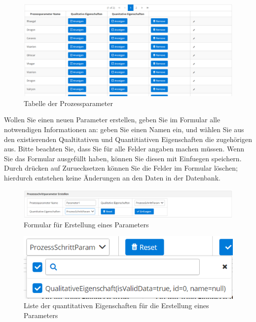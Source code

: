 \documentclass[enabledeprecatedfontcommands,fontsize=12pt,paper=a4,twoside]{scrartcl}
\begin{document}
\begin{figure}[h!]
\begin{center}
 \includegraphics[width=\textwidth]{screenshots/pk/parametertabelle.png}
  \caption{Tabelle der Prozessparameter}
  \label{fig:boat2}
\end{center}
\end{figure}


Wollen Sie einen neuen Parameter erstellen, geben Sie im Formular alle notwendigen Informationen an: geben Sie einen Namen ein, und wählen Sie aus den existierenden Qualtitativen und Quantitiativen Eigenschaften die zugehörigen aus. Bitte beachten Sie, dass Sie für alle Felder angaben machen müssen. Wenn Sie das Formular ausgefüllt haben, können Sie diesen mit Einfuegen speichern. Durch drücken auf Zuruecksetzen können Sie die Felder im Formular löschen; hierdurch entstehen keine Änderungen an den Daten in der Datenbank. \\

\begin{figure}[h!]
\begin{center}
 \includegraphics[width=\textwidth]{screenshots/pk/parameterformular.png}
  \caption{Formular für Erstellung eines Parameters}
  \label{fig:boat2}
\end{center}
\end{figure}


\begin{figure}[h!]
\begin{center}
 \includegraphics[width=\textwidth]{screenshots/pk/parameterquanti.png}
  \caption{Liste der quantitativen Eigenschaften für die Erstellung eines Parameters}
  \label{fig:boat2}
\end{center}
\end{figure}
\end{document}
